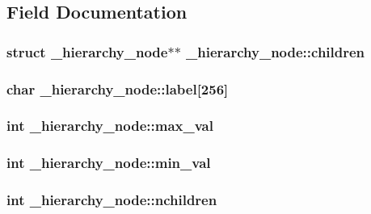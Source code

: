 \subsection{Field Documentation}
\hypertarget{struct__hierarchy__node_afc23d4fe6426873164cdaab2f3d4f0cd}{
\subsubsection[{children}]{\setlength{\rightskip}{0pt plus 5cm}struct {\bf \_\-hierarchy\_\-node}$\ast$$\ast$ {\bf \_\-hierarchy\_\-node::children}}}
\label{struct__hierarchy__node_afc23d4fe6426873164cdaab2f3d4f0cd}
\hypertarget{struct__hierarchy__node_ae498f6fd14ca058a3ae0a95d5425451a}{
\subsubsection[{label}]{\setlength{\rightskip}{0pt plus 5cm}char {\bf \_\-hierarchy\_\-node::label}\mbox{[}256\mbox{]}}}
\label{struct__hierarchy__node_ae498f6fd14ca058a3ae0a95d5425451a}
\hypertarget{struct__hierarchy__node_a79ea88029938dc30ab8f159405d12c87}{
\subsubsection[{max\_\-val}]{\setlength{\rightskip}{0pt plus 5cm}int {\bf \_\-hierarchy\_\-node::max\_\-val}}}
\label{struct__hierarchy__node_a79ea88029938dc30ab8f159405d12c87}
\hypertarget{struct__hierarchy__node_a13ceebd7b435b9ef347fb90d9e6bbfe4}{
\subsubsection[{min\_\-val}]{\setlength{\rightskip}{0pt plus 5cm}int {\bf \_\-hierarchy\_\-node::min\_\-val}}}
\label{struct__hierarchy__node_a13ceebd7b435b9ef347fb90d9e6bbfe4}
\hypertarget{struct__hierarchy__node_a849256ce1039e2cefaaf64d91171be0a}{
\subsubsection[{nchildren}]{\setlength{\rightskip}{0pt plus 5cm}int {\bf \_\-hierarchy\_\-node::nchildren}}}
